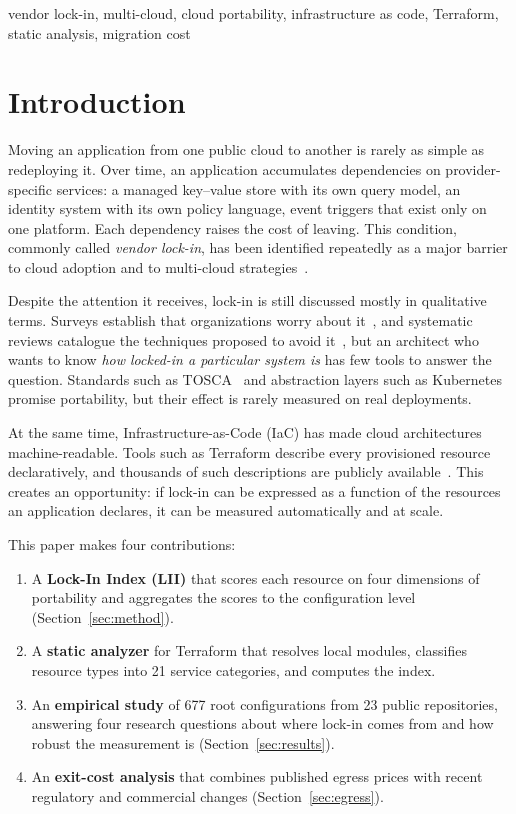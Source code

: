\documentclass[conference]{IEEEtran}
\begin{document}
\begin{IEEEkeywords}
vendor lock-in, multi-cloud, cloud portability, infrastructure as code, Terraform, static analysis, migration cost
\end{IEEEkeywords}

\section{Introduction}

Moving an application from one public cloud to another is rarely as simple as redeploying it. Over time, an application accumulates dependencies on provider-specific services: a managed key--value store with its own query model, an identity system with its own policy language, event triggers that exist only on one platform. Each dependency raises the cost of leaving. This condition, commonly called \emph{vendor lock-in}, has been identified repeatedly as a major barrier to cloud adoption and to multi-cloud strategies~\cite{opara2014,opara2016,silva2013}.

Despite the attention it receives, lock-in is still discussed mostly in qualitative terms. Surveys establish that organizations worry about it~\cite{opara2016}, and systematic reviews catalogue the techniques proposed to avoid it~\cite{silva2013}, but an architect who wants to know \emph{how locked-in a particular system is} has few tools to answer the question. Standards such as TOSCA~\cite{tosca,binz2012} and abstraction layers such as Kubernetes~\cite{burns2016} promise portability, but their effect is rarely measured on real deployments.

At the same time, Infrastructure-as-Code (IaC) has made cloud architectures machine-readable. Tools such as Terraform describe every provisioned resource declaratively, and thousands of such descriptions are publicly available~\cite{buehler2025}. This creates an opportunity: if lock-in can be expressed as a function of the resources an application declares, it can be measured automatically and at scale.

This paper makes four contributions:
\begin{enumerate}
\item A \textbf{Lock-In Index (LII)} that scores each resource on four dimensions of portability and aggregates the scores to the configuration level (Section~\ref{sec:method}).
\item A \textbf{static analyzer} for Terraform that resolves local modules, classifies resource types into 21 service categories, and computes the index.
\item An \textbf{empirical study} of 677 root configurations from 23 public repositories, answering four research questions about where lock-in comes from and how robust the measurement is (Section~\ref{sec:results}).
\item An \textbf{exit-cost analysis} that combines published egress prices with recent regulatory and commercial changes (Section~\ref{sec:egress}).
\end{enumerate}
\end{document}
